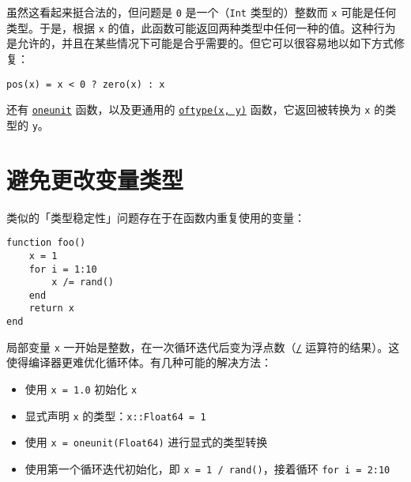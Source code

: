 虽然这看起来挺合法的，但问题是 \texttt{0} 是一个（\texttt{Int} 类型的）整数而 \texttt{x} 可能是任何类型。于是，根据 \texttt{x} 的值，此函数可能返回两种类型中任何一种的值。这种行为是允许的，并且在某些情况下可能是合乎需要的。但它可以很容易地以如下方式修复：




\begin{verbatim}
pos(x) = x < 0 ? zero(x) : x
\end{verbatim}



还有 \hyperlink{2310843180104103470}{\texttt{oneunit}} 函数，以及更通用的 \hyperlink{374166931194490566}{\texttt{oftype(x, y)}} 函数，它返回被转换为 \texttt{x} 的类型的 \texttt{y}。



\hypertarget{6976604449962643011}{}


\section{避免更改变量类型}



类似的「类型稳定性」问题存在于在函数内重复使用的变量：




\begin{verbatim}
function foo()
    x = 1
    for i = 1:10
        x /= rand()
    end
    return x
end
\end{verbatim}



局部变量 \texttt{x} 一开始是整数，在一次循环迭代后变为浮点数（\hyperlink{4103478871488785445}{\texttt{/}} 运算符的结果）。这使得编译器更难优化循环体。有几种可能的解决方法：



\begin{itemize}
\item 使用 \texttt{x = 1.0} 初始化 \texttt{x}


\item 显式声明 \texttt{x} 的类型：\texttt{x::Float64 = 1}


\item 使用 \texttt{x = oneunit(Float64)} 进行显式的类型转换


\item 使用第一个循环迭代初始化，即 \texttt{x = 1 / rand()}，接着循环 \texttt{for i = 2:10}

\end{itemize}


\hypertarget{16258602729394793584}{}


